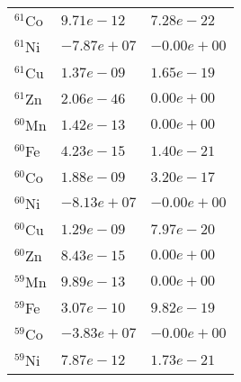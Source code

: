\begin{tabular}{lll}
 $^{61}$Co & $9.71e-12 $                                                        & $7.28e-22 $                                                           \\
 $^{61}$Ni & $-7.87e+07 $                                                       & $-0.00e+00 $                                                          \\
 $^{61}$Cu & $1.37e-09 $                                                        & $1.65e-19 $                                                           \\
 $^{61}$Zn & $2.06e-46 $                                                        & $0.00e+00 $                                                           \\
 $^{60}$Mn & $1.42e-13 $                                                        & $0.00e+00 $                                                           \\
 $^{60}$Fe & $4.23e-15 $                                                        & $1.40e-21 $                                                           \\
 $^{60}$Co & $1.88e-09 $                                                        & $3.20e-17 $                                                           \\
 $^{60}$Ni & $-8.13e+07 $                                                       & $-0.00e+00 $                                                          \\
 $^{60}$Cu & $1.29e-09 $                                                        & $7.97e-20 $                                                           \\
 $^{60}$Zn & $8.43e-15 $                                                        & $0.00e+00 $                                                           \\
 $^{59}$Mn & $9.89e-13 $                                                        & $0.00e+00 $                                                           \\
 $^{59}$Fe & $3.07e-10 $                                                        & $9.82e-19 $                                                           \\
 $^{59}$Co & $-3.83e+07 $                                                       & $-0.00e+00 $                                                          \\
 $^{59}$Ni & $7.87e-12 $                                                        & $1.73e-21 $                                                           \\

\end{tabular}
